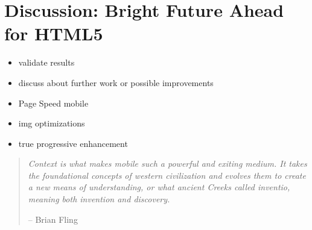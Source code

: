 \chapter{Discussion: Bright Future Ahead for HTML5}
\label{chapter:discussion}

\begin{itemize}
\item validate results
\item discuss about further work or possible improvements
\item Page Speed mobile
\item img optimizations
\item true progressive enhancement
\end{itemize}

\begin{quotation}
  \noindent \textit{Context  is what makes mobile such  a powerful and
    exiting  medium. It  takes  the foundational  concepts of  western
    civilization  and   evolves  them  to   create  a  new   means  of
    understanding,  or what  ancient Creeks  called  inventio, meaning
    both invention and discovery.}
  \begin{flushright}
    -- Brian Fling \cite{fling2009mobile}
  \end{flushright}
\end{quotation}
